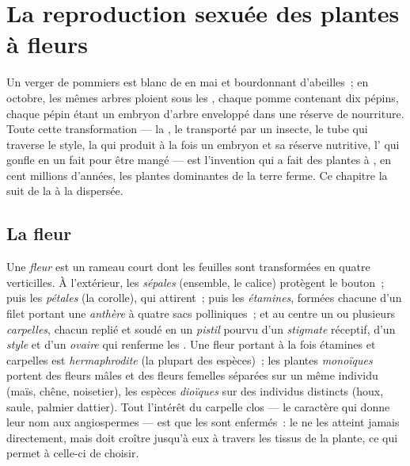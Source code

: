 \chapter{La reproduction sexuée des plantes à fleurs}\label{ch:b2:angiosperm-reproduction}

Un verger de pommiers est blanc de  en mai et bourdonnant
d'abeilles~; en octobre, les mêmes arbres ploient sous les , chaque
pomme contenant dix pépins, chaque pépin étant un embryon d'arbre
enveloppé dans une réserve de nourriture. Toute cette transformation
--- la , le  transporté par un insecte, le tube qui traverse
le style, la  qui produit à la fois un embryon et sa
réserve nutritive, l' qui gonfle en un  fait pour être mangé
--- est l'invention qui a fait des plantes à , en cent millions
d'années, les plantes dominantes de la terre ferme. Ce chapitre la suit
de la  à la  dispersée.

\section{La fleur}

\begin{definition}\label{def:b2:angiosperm-reproduction:flower}
Une \emph{fleur} est un rameau court dont les feuilles sont
transformées en quatre verticilles. À l'extérieur, les \emph{sépales}
(ensemble, le calice) protègent le bouton~; puis les \emph{pétales} (la
corolle), qui attirent~; puis les \emph{étamines}, formées chacune d'un
filet portant une \emph{anthère} à quatre sacs polliniques~; et au
centre un ou plusieurs \emph{carpelles}, chacun replié et soudé en un
\emph{pistil} pourvu d'un \emph{stigmate} réceptif, d'un \emph{style} et
d'un \emph{ovaire} qui renferme les \emph{}. Une fleur portant à
la fois étamines et carpelles est \emph{hermaphrodite} (la plupart des
espèces)~; les plantes \emph{monoïques} portent des fleurs mâles et des
fleurs femelles séparées sur un même individu (maïs, chêne, noisetier),
les espèces \emph{dioïques} sur des individus distincts (houx, saule,
palmier dattier). Tout l'intérêt du carpelle clos --- le caractère qui
donne leur nom aux angiospermes --- est que les  sont enfermés~:
le  ne les atteint jamais directement, mais doit croître jusqu'à
eux à travers les tissus de la plante, ce qui permet à celle-ci de
choisir.
\end{definition}

